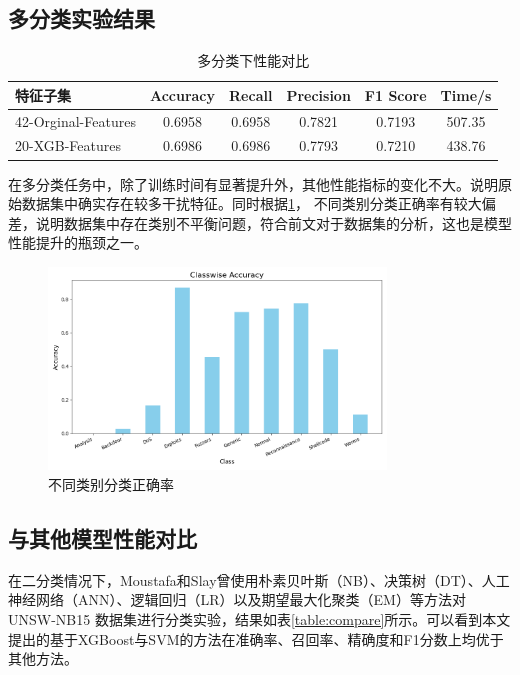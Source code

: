 \documentclass{article}
\begin{document}
\subsection{多分类实验结果}

\begin{table}[H]
  \caption{多分类下性能对比}
  \label{table:feature_selection_performance_m}
  \centering
  \begin{tabular}{lccccc}
    \toprule
    特征子集          & Accuracy & Recall & Precision & F1 Score & Time/s \\ \midrule
    42-Orginal-Features     & 0.6958   & 0.6958 & 0.7821    & 0.7193   & 507.35  \\    
    20-XGB-Features    & 0.6986   & 0.6986 & 0.7793    & 0.7210   & 438.76  \\\bottomrule 

  \end{tabular}
\end{table}
在多分类任务中，除了训练时间有显著提升外，其他性能指标的变化不大。说明原始数据集中确实存在较多干扰特征。同时根据\ref{fig:class}，
不同类别分类正确率有较大偏差，说明数据集中存在类别不平衡问题，符合前文对于数据集的分析，这也是模型性能提升的瓶颈之一。

\begin{figure}[htpb]
  \centering
  \includegraphics[width=0.8\textwidth]{./png/classwise_accuracy.png}
  \caption{不同类别分类正确率}
  \label{fig:class}
\end{figure}

\subsection{与其他模型性能对比}
在二分类情况下，Moustafa和Slay曾使用朴素贝叶斯（NB）、决策树（DT）、人工神经网络（ANN）、逻辑回归（LR）以及期望最大化聚类（EM）等方法对UNSW-NB15
数据集进行分类实验，结果如表\ref{table:compare}所示。可以看到本文提出的基于XGBoost与SVM的方法在准确率、召回率、精确度和F1分数上均优于其他方法。
\end{document}
